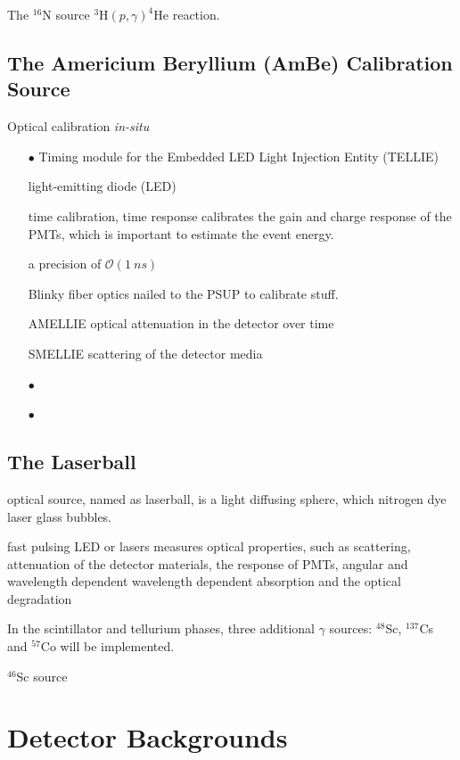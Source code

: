 The $^{16}$N source
$^{3}$H$(p,\gamma)^{4}$He reaction.




\subsection{The Americium Beryllium (AmBe) Calibration Source}

Optical calibration  {\emph {in-situ}} 
\begin{itemize}  
	\item[$\bullet$] Timing module for the Embedded LED Light Injection Entity (TELLIE)
	
	light-emitting diode (LED)
	
	
	time calibration, time response
	calibrates the gain and charge response of the PMTs, which is important to estimate the event energy.
	
	a precision of $\mathcal{O} (1~ns)$
	
	Blinky fiber optics nailed to the PSUP to calibrate stuff.
	
	AMELLIE
	optical attenuation in the detector over time
	
	SMELLIE scattering of the detector media
	
	\item[$\bullet$]  
	
	
	\item[$\bullet$] 
\end{itemize}


\subsection{The Laserball}

optical source, named as laserball, is a light diffusing sphere, which nitrogen dye laser glass bubbles.



fast pulsing LED or lasers
measures optical properties, such as scattering, attenuation of the detector materials, the response of PMTs, 
angular and wavelength dependent
wavelength dependent absorption and the optical degradation

In the scintillator and tellurium phases, three additional $\gamma$ sources: $^{48}$Sc, $^{137}$Cs and $^{57}$Co will be implemented.

$^{46}$Sc source

\section{Detector Backgrounds}

